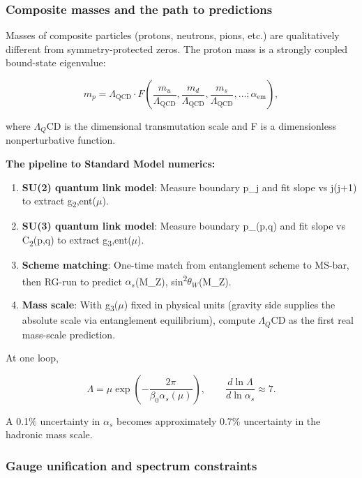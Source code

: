 \documentclass[11pt,a4paper]{article}
\theoremstyle{remark}
\begin{document}
\subsubsection{Composite masses and the path to predictions}\label{composite-masses-and-the-path-to-predictions}

Masses of composite particles (protons, neutrons, pions, etc.) are
qualitatively different from symmetry-protected zeros. The proton mass is a
strongly coupled bound-state eigenvalue:

\[
m_p = \Lambda_{\mathrm{QCD}} \cdot F\left(\frac{m_u}{\Lambda_{\mathrm{QCD}}},
\frac{m_d}{\Lambda_{\mathrm{QCD}}}, \frac{m_s}{\Lambda_{\mathrm{QCD}}}, \ldots;
\alpha_{\mathrm{em}}\right),
\]

where \(\Lambda{}_Q\)CD is the dimensional transmutation scale and F is a
dimensionless nonperturbative function.

\textbf{The pipeline to Standard Model numerics:}

\begin{enumerate}
\def\labelenumi{\arabic{enumi}.}
\item
  \textbf{SU(2) quantum link model}: Measure boundary p\_j and fit slope
  vs j(j+1) to extract g\textsubscript{2},ent(\ensuremath{\mu}).
\item
  \textbf{SU(3) quantum link model}: Measure boundary p\_(p,q) and fit
  slope vs C\textsubscript{2}(p,q) to extract g\textsubscript{3},ent(\ensuremath{\mu}).
\item
  \textbf{Scheme matching}: One-time match from entanglement scheme to
  MS-bar, then RG-run to predict \(\alpha_s\)(M\_Z), sin\textsuperscript{2}\(\theta_W\)(M\_Z).
\item
  \textbf{Mass scale}: With g\textsubscript{3}(\ensuremath{\mu}) fixed in physical units (gravity side
  supplies the absolute scale via entanglement equilibrium), compute
  \(\Lambda{}_Q\)CD as the first real mass-scale prediction.
\end{enumerate}

At one loop,

\[
\Lambda = \mu \exp\left(-\frac{2\pi}{\beta_0 \alpha_s(\mu)}\right),
\qquad
\frac{d \ln \Lambda}{d \ln \alpha_s} \approx 7.
\]

A 0.1\% uncertainty in \(\alpha_s\) becomes approximately 0.7\% uncertainty in the
hadronic mass scale.

\subsubsection{Gauge unification and spectrum constraints}\label{gauge-unification-and-spectrum-constraints}
\end{document}
